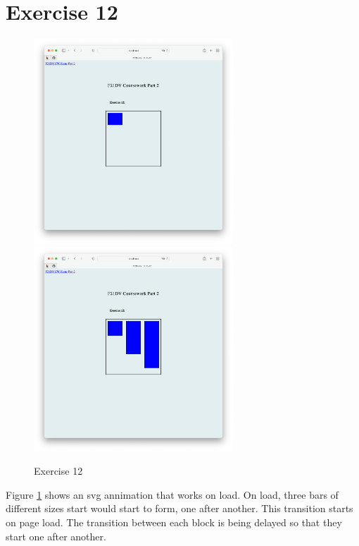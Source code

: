 \documentclass{scrreprt}
\begin{document}
\newpage
\section{Exercise 12}
\begin{figure}[!ht]
    \centering
    \includegraphics[width = 7.5cm]{images/ex12_1.png}
    \includegraphics[width = 7.5cm]{images/ex12_2.png}
    \label{fig:ex12}
    \caption{Exercise 12}
\end{figure}
\FloatBarrier
% 
Figure \ref{fig:ex12} shows an svg annimation that works on load. On load, three bars of different sizes start would start to form, one after another. This transition starts on page load. The transition between each block is being delayed so that they start one after another.

\newpage
\end{document}
